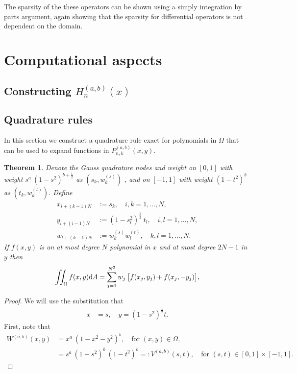 \documentclass[11pt, oneside]{article}   	%
\newcommand{\half}{\frac{1}{2}}
\newtheorem{theorem}{Theorem}
\begin{document}
The sparsity of the these operators can be shown using a simply integration by parts argument, again showing that the sparsity for differential operators is not dependent on the domain.

\section{Computational aspects}

\subsection{Constructing $H_n^{(a,b)}(x)$}

\subsection{Quadrature rules}

In this section we construct a quadrature rule exact for polynomials in $\Omega$ that can be used to expand functions in $P_{n,k}^{(a,b)}(x,y)$. 


\begin{theorem}

Denote the  Gauss quadrature nodes and weight on \([0,1]\) with weight \(s^a \: (1-s^2)^{b+\half}\) as $(s_k,w_k^{(s)})$ , and
 on \([-1,1]\) with weight \((1-t^2)^b\) as $(t_k,w_k^{(t)})$. Define
\begin{align}
x_{i+(k-1)N} &:= s_k, \quad i,k = 1,\dots,N, \\
y_{l+(i-1)N} &:= (1-s_l^2)^\half \: t_l, \quad i,l = 1,\dots,N, \\
w_{l+(k-1)N} &:= w_k^{(s)} w_l^{(t)}, \quad k,l = 1,\dots,N.
\end{align}
If $f(x,y)$ is an at most degree $N$ polynomial in $x$ and at most degree $2N-1$ in $y$ then
$$
\iint_\Omega f(x,y) {\rm d} A =\sum_{j=1}^{N^2} w_j \: \big[ f(x_j, y_j) + f(x_j, -y_j) \big],
$$

\end{theorem}
\begin{proof}

We will use the substitution that
\begin{align}
x &= s, \quad y = (1-s^2)^\half t.
\end{align}
First, note that
\begin{align}
W^{(a,b)}(x,y) &= x^a \: (1-x^2-y^2)^b, \quad \text{for } (x,y) \in \Omega, \\
		      &= s^a \: (1-s^2)^{b} \: (1-t^2)^b =: V^{(a,b)}(s,t), \quad \text{for } (s,t) \in [0,1] \times [-1,1].
\end{align}

\end{proof}
\end{document}
